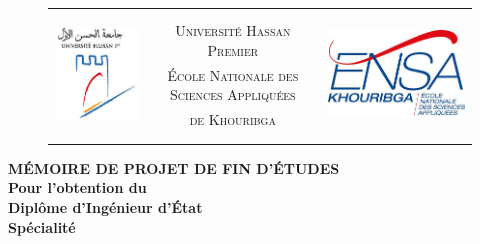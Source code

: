 \documentclass[a4paper,11pt,oneside]{report}
\author{Badr ELOUIZ}
\begin{document}
\sloppy

\makeatletter
  \begin{titlepage}
  \centering
  
    \begin{figure}[t]
        \begin{tabular}{c c c}
            \multirow{7}{*}{\includegraphics[scale=0.45]{HASS.png}} & &             \multirow{7}{*}{\includegraphics[scale=0.35]{logens.png}}\\
             & & \\
             & \textsc{Université Hassan Premier} & \\
             & \textsc{\'Ecole Nationale des Sciences Appliqu\'ees} & \\
             & \textsc{de Khouribga} & \\
             & & \\
             & & \\
        \end{tabular}
    \end{figure}
        \vfill
    {\LARGE \textbf{M\'EMOIRE DE PROJET DE FIN D'\'ETUDES}}\\
        \vspace{0.5em}
    {\large \textbf{Pour l'obtention du}}\\
        \vspace{0.5em}
    {\LARGE \textbf{Diplôme d'Ingénieur d'\'Etat}}\\
        \vspace{0.5em}
    {\large \textbf{Spécialité}}\\

\end{titlepage}
\end{document}
